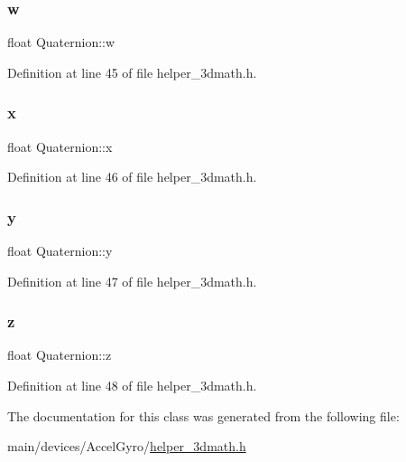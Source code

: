 \subsubsection{\texorpdfstring{w}{w}}
{\footnotesize\ttfamily float Quaternion\+::w}



Definition at line 45 of file helper\+\_\+3dmath.\+h.

\mbox{\label{classQuaternion_a8b80f191a3155cc0158d2b4f4d50b2cb}} 
\subsubsection{\texorpdfstring{x}{x}}
{\footnotesize\ttfamily float Quaternion\+::x}



Definition at line 46 of file helper\+\_\+3dmath.\+h.

\mbox{\label{classQuaternion_a3bd3f270462944423611f44e19d2511b}} 
\subsubsection{\texorpdfstring{y}{y}}
{\footnotesize\ttfamily float Quaternion\+::y}



Definition at line 47 of file helper\+\_\+3dmath.\+h.

\mbox{\label{classQuaternion_a625cb732d8ff3083e7852b86b736ab29}} 
\subsubsection{\texorpdfstring{z}{z}}
{\footnotesize\ttfamily float Quaternion\+::z}



Definition at line 48 of file helper\+\_\+3dmath.\+h.



The documentation for this class was generated from the following file\+:\begin{DoxyCompactItemize}
\item 
main/devices/\+Accel\+Gyro/\mbox{\hyperlink{helper__3dmath_8h}{helper\+\_\+3dmath.\+h}}\end{DoxyCompactItemize}
